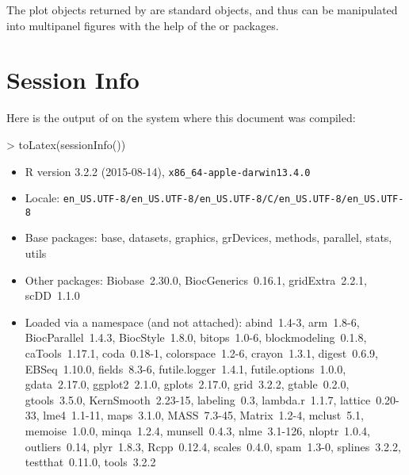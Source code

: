 \documentclass{article}
\begin{document}
The plot objects returned by  are standard  objects, and thus can be manipulated into multipanel figures with the help of the  or  packages.



  
\section{Session Info}
Here is the output of  on the system where this document was compiled:

\begin{Schunk}
\begin{Sinput}
> toLatex(sessionInfo())
\end{Sinput}
\begin{itemize}\raggedright
  \item R version 3.2.2 (2015-08-14), \verb|x86_64-apple-darwin13.4.0|
  \item Locale: \verb|en_US.UTF-8/en_US.UTF-8/en_US.UTF-8/C/en_US.UTF-8/en_US.UTF-8|
  \item Base packages: base, datasets, graphics, grDevices, methods, parallel,
    stats, utils
  \item Other packages: Biobase~2.30.0, BiocGenerics~0.16.1, gridExtra~2.2.1,
    scDD~1.1.0
  \item Loaded via a namespace (and not attached): abind~1.4-3, arm~1.8-6,
    BiocParallel~1.4.3, BiocStyle~1.8.0, bitops~1.0-6, blockmodeling~0.1.8,
    caTools~1.17.1, coda~0.18-1, colorspace~1.2-6, crayon~1.3.1, digest~0.6.9,
    EBSeq~1.10.0, fields~8.3-6, futile.logger~1.4.1, futile.options~1.0.0,
    gdata~2.17.0, ggplot2~2.1.0, gplots~2.17.0, grid~3.2.2, gtable~0.2.0,
    gtools~3.5.0, KernSmooth~2.23-15, labeling~0.3, lambda.r~1.1.7,
    lattice~0.20-33, lme4~1.1-11, maps~3.1.0, MASS~7.3-45, Matrix~1.2-4,
    mclust~5.1, memoise~1.0.0, minqa~1.2.4, munsell~0.4.3, nlme~3.1-126,
    nloptr~1.0.4, outliers~0.14, plyr~1.8.3, Rcpp~0.12.4, scales~0.4.0,
    spam~1.3-0, splines~3.2.2, testthat~0.11.0, tools~3.2.2
\end{itemize}\end{Schunk}


\end{document}

